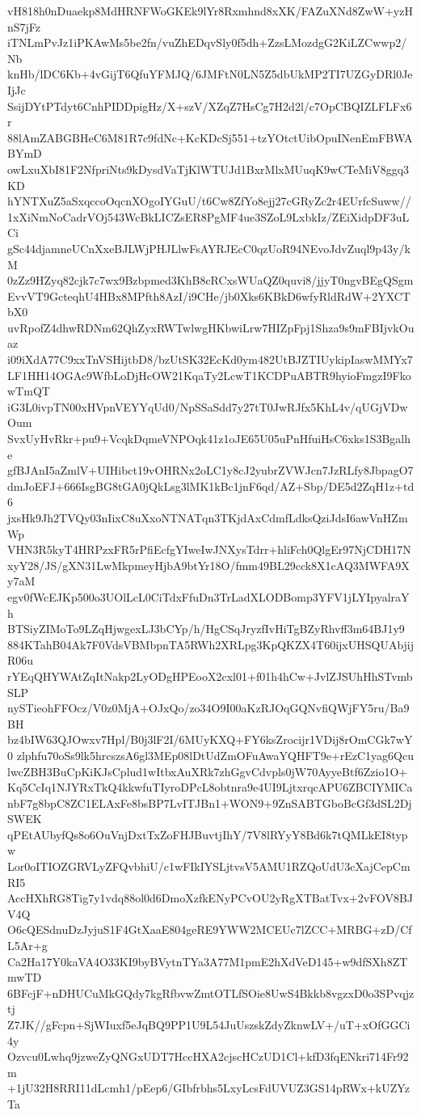 vH818h0nDuaekp8MdHRNFWoGKEk9lYr8Rxmhnd8xXK/FAZuXNd8ZwW+yzHnS7jFz
iTNLmPvJz1iPKAwMs5be2fn/vuZhEDqvSly0f5dh+ZzsLMozdgG2KiLZCwwp2/Nb
knHb/lDC6Kb+4vGijT6QfuYFMJQ/6JMFtN0LN5Z5dbUkMP2TI7UZGyDRl0JeIjJc
SsijDYtPTdyt6CnhPIDDpigHz/X+szV/XZqZ7HsCg7H2d2l/c7OpCBQIZLFLFx6r
88lAmZABGBHeC6M81R7c9fdNc+KcKDcSj551+tzYOtctUibOpuINenEmFBWABYmD
owLxuXbI81F2NfpriNts9kDysdVaTjKlWTUJd1BxrMlxMUuqK9wCTeMiV8ggq3KD
hYNTXuZ5aSxqccoOqcnXOgoIYGuU/t6Cw8ZfYo8ejj27cGRyZc2r4EUrfcSuww//
1xXiNmNoCadrVOj543WcBkLICZsER8PgMF4ue3SZoL9LxbkIz/ZEiXidpDF3uLCi
gSc44djamneUCnXxeBJLWjPHJLlwFsAYRJEcC0qzUoR94NEvoJdvZuql9p43y/kM
0zZz9HZyq82cjk7c7wx9Bzbpmed3KhB8cRCxsWUaQZ0quvi8/jjyT0ngvBEgQSgm
EvvVT9GcteqhU4HBx8MPfth8AzI/i9CHe/jb0Xks6KBkD6wfyRldRdW+2YXCTbX0
uvRpofZ4dhwRDNm62QhZyxRWTwlwgHKbwiLrw7HIZpFpj1Shza9s9mFBIjvkOuaz
i09iXdA77C9xxTnVSHijtbD8/bzUtSK32EcKd0ym482UtBJZTIUykipIaswMMYx7
LF1HH14OGAc9WfbLoDjHcOW21KqaTy2LcwT1KCDPuABTR9hyioFmgzI9FkowTmQT
iG3L0ivpTN00xHVpnVEYYqUd0/NpSSaSdd7y27tT0JwRJfx5KhL4v/qUGjVDwOum
SvxUyHvRkr+pu9+VcqkDqmeVNPOqk41z1oJE65U05uPnHfuiHsC6xks1S3Bgalhe
gfBJAnI5aZmlV+UIHibct19vOHRNx2oLC1y8cJ2yubrZVWJcn7JzRLfy8JbpagO7
dmJoEFJ+666IsgBG8tGA0jQkLsg3lMK1kBc1jnF6qd/AZ+Sbp/DE5d2ZqH1z+td6
jxsHk9Jh2TVQy03nIixC8uXxoNTNATqn3TKjdAxCdmfLdksQziJdsI6awVnHZmWp
VHN3R5kyT4HRPzxFR5rPfiEcfgYIweIwJNXysTdrr+hliFch0QlgEr97NjCDH17N
xyY28/JS/gXN31LwMkpmeyHjbA9btYr18O/fmm49BL29cck8X1cAQ3MWFA9Xy7aM
egv0fWcEJKp500o3UOlLcL0CiTdxFfuDn3TrLadXLODBomp3YFV1jLYIpyalraYh
BTSiyZIMoTo9LZqHjwgexLJ3bCYp/h/HgCSqJryzfIvHiTgBZyRhvff3m64BJ1y9
884KTahB04Ak7F0VdsVBMbpnTA5RWh2XRLpg3KpQKZX4T60ijxUHSQUAbjijR06u
rYEqQHYWAtZqItNakp2LyODgHPEooX2cxl01+f01h4hCw+JvlZJSUhHhSTvmbSLP
nySTieohFFOcz/V0z0MjA+OJxQo/zo34O9I00aKzRJOqGQNvfiQWjFY5ru/Ba9BH
bz4bIW63QJOwxv7Hpl/B0j3lF2I/6MUyKXQ+FY6ksZrocijr1VDij8rOmCGk7wY0
zlphfu70oSs9lk5hrcszsA6gl3MEp08lDtUdZmOFuAwaYQHFT9e+rEzC1yag6Qcu
lwcZBH3BuCpKiKJsCplud1wItbxAuXRk7zhGgvCdvpls0jW70AyyeBtf6Zzio1O+
Kq5CcIq1NJYRxTkQ4kkwfuTIyroDPcL8obtnra9e4UI9LjtxrqcAPU6ZBCIYMICa
nbF7g8bpC8ZC1ELAxFe8bsBP7LvITJBn1+WON9+9ZnSABTGboBcGf3dSL2DjSWEK
qPEtAUbyfQs8o6OuVnjDxtTxZoFHJBuvtjIhY/7V8lRYyY8Bd6k7tQMLkEI8typw
Lor0oITIOZGRVLyZFQvbhiU/c1wFIkIYSLjtvsV5AMU1RZQoUdU3cXajCepCmRI5
AccHXhRG8Tig7y1vdq88ol0d6DmoXzfkENyPCvOU2yRgXTBatTvx+2vFOV8BJV4Q
O6cQESdnuDzJyjuS1F4GtXaaE804geRE9YWW2MCEUc7lZCC+MRBG+zD/CfL5Ar+g
Ca2Ha17Y0kaVA4O33KI9byBVytnTYa3A77M1pmE2hXdVeD145+w9dfSXh8ZTmwTD
6BFcjF+nDHUCuMkGQdy7kgRfbvwZmtOTLfSOie8UwS4Bkkb8vgzxD0o3SPvqjztj
Z7JK//gFcpn+SjWIuxf5eJqBQ9PP1U9L54JuUszskZdyZknwLV+/uT+xOfGGCi4y
Ozvcu0Lwhq9jzweZyQNGxUDT7HccHXA2cjscHCzUD1Cl+kfD3fqENkri714Fr92m
+1jU32H8RRI11dLcmh1/pEep6/GIbfrbhs5LxyLcsFdUVUZ3GS14pRWx+kUZYzTa
